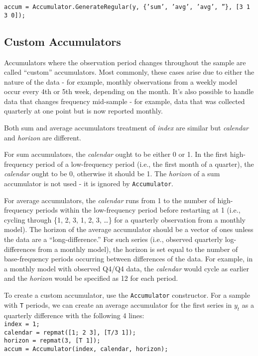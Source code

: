 \documentclass{article}
\begin{document}
\hspace{5mm} \texttt{accum = Accumulator.GenerateRegular(y, \{'sum', 'avg', 'avg', ''\}, [3 1 3 0]);}

\subsection{Custom Accumulators}

Accumulators where the observation period changes throughout the sample are called ``custom'' accumulators. Most commonly, these cases arise due to either the nature of the data - for example, monthly observations from a weekly model occur every 4th or 5th week, depending on the month. It's also possible to handle data that changes frequency mid-sample - for example, data that was collected quarterly at one point but is now reported monthly.

Both sum and average accumulators treatment of \emph{index} are similar but \emph{calendar} and \emph{horizon} are different. 

For sum accumulators, the \emph{calendar} ought to be either 0 or 1. In the first high-frequency period of a low-frequency period (i.e., the first month of a quarter), the \emph{calendar} ought to be 0, otherwise it should be 1. The \emph{horizon} of a sum accumulator is not used - it is ignored by \texttt{Accumulator}. 

For average accumulators, the \emph{calendar} runs from 1 to the number of high-frequency periods within the low-frequency period before restarting at 1 (i.e., cycling through \{1, 2, 3, 1, 2, 3, \dots\} for a quarterly observation from a monthly model). The horizon of the average accumulator should be a vector of ones unless the data are a ``long-difference.'' For such series (i.e., observed quarterly log-differences from a monthly model), the horizon is set equal to the number of base-frequency periods occurring between differences of the data. For example, in a monthly model with observed Q4/Q4 data, the \emph{calendar} would cycle as earlier and the \emph{horizon} would be specified as 12 for each period. 

To create a custom accumulator, use the \texttt{Accumulator} constructor. For a sample with \texttt{T} periods, we can create an average accumulator for the first series in $y_t$ as a quarterly difference with the following 4 lines: \\
  \hphantom{5mm} \texttt{index = 1;} \\ 
  \hphantom{5mm} \texttt{calendar = repmat([1; 2 3], [T/3 1]);} \\ 
  \hphantom{5mm} \texttt{horizon = repmat(3, [T 1]);} \\ 
  \hphantom{5mm} \texttt{accum = Accumulator(index, calendar, horizon);}
\end{document}

